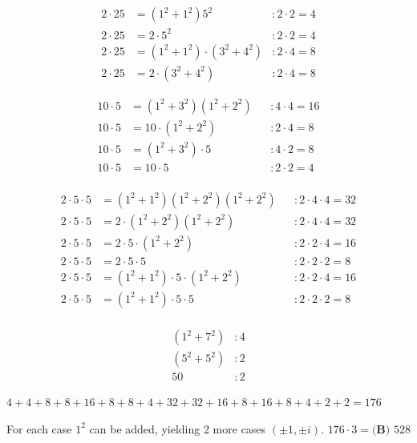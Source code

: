 \begin{enumerate}
 
 \begin{align*} 2 \cdot 25 &= (1^2+1^2)5^2 &: 2 \cdot 2 = 4\\ 2 \cdot 25 &= 2 \cdot 5^2 &: 2 \cdot 2 = 4\\ 2 \cdot 25 &= (1^2+1^2) \cdot (3^2+4^2) &: 2 \cdot 4 = 8\\ 2 \cdot 25 &= 2 \cdot (3^2+4^2) &: 2 \cdot 4 = 8 \end{align*}


 \begin{align*} 10 \cdot 5 &= (1^2+3^2)(1^2+2^2) &&: 4 \cdot 4 = 16\\ 10 \cdot 5 &= 10 \cdot (1^2+2^2) &&: 2 \cdot 4 = 8\\ 10 \cdot 5 &= (1^2+3^2) \cdot 5 &&: 4 \cdot 2 = 8\\ 10 \cdot 5 &= 10 \cdot 5 &&: 2 \cdot 2 = 4\\ \end{align*}


 \begin{align*} 2 \cdot 5  \cdot 5&= (1^2+1^2)(1^2+2^2)(1^2+2^2) &&: 2 \cdot 4 \cdot 4 = 32\\ 2 \cdot 5  \cdot 5&= 2 \cdot (1^2+2^2)(1^2+2^2) &&: 2 \cdot 4 \cdot 4 = 32\\ 2 \cdot 5  \cdot 5&= 2 \cdot 5 \cdot (1^2+2^2) &&: 2 \cdot 2 \cdot 4 = 16\\ 2 \cdot 5  \cdot 5&= 2 \cdot 5 \cdot 5 &&: 2 \cdot 2 \cdot 2 = 8\\ 2 \cdot 5  \cdot 5&= (1^2+1^2) \cdot 5 \cdot (1^2+2^2) &&: 2 \cdot 2 \cdot 4 = 16\\ 2 \cdot 5  \cdot 5&= (1^2+1^2) \cdot 5 \cdot 5 &&: 2 \cdot 2 \cdot 2 = 8\\ \end{align*}


 \begin{align*} (1^2+7^2) &: 4\\ (5^2+5^2) &: 2\\ 50 &: 2 \end{align*}

$4+4+8+8+16+8+8+4+32+32+16+8+16+8+4+2+2 = 176$

 For each case $1^2$ can be added, yielding 2 more cases $(\pm 1, \pm i)$. $176 \cdot 3 = \boxed{\textbf{(B) }528}$



\end{enumerate}